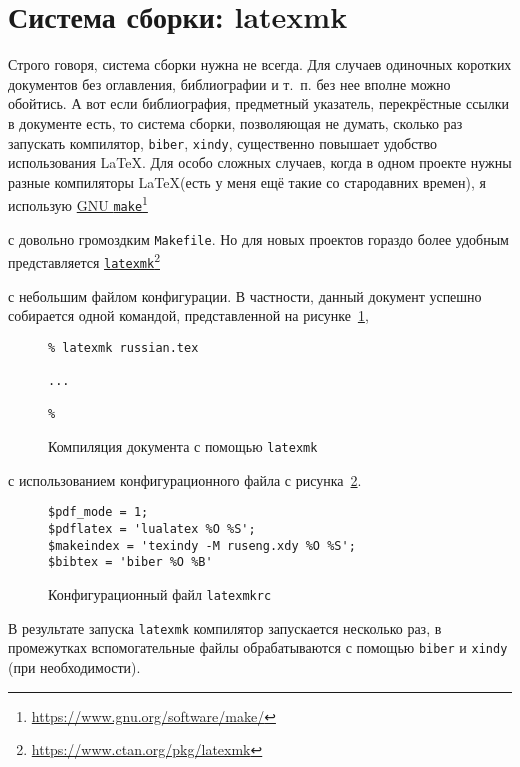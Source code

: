 \documentclass[a4paper,12pt]{article}
\let\orighref=\href
\renewcommand\href[2]{%
  \orighref{#1}{#2}\footnote{\url{#1}}%
}
\begin{document}
\section{Система сборки: latexmk}
Строго говоря, система сборки нужна не всегда. Для случаев одиночных коротких
документов без оглавления, библиографии и т.~п. без нее вполне можно
обойтись. А вот если библиография, предметный указатель, перекрёстные
ссылки в документе есть, то система сборки, позволяющая не думать, сколько
раз запускать компилятор, \texttt{biber}, \texttt{xindy}, существенно
повышает удобство использования \LaTeX. Для особо сложных случаев, когда
в одном проекте нужны разные компиляторы \LaTeX (есть у меня ещё такие со
стародавних времен), я использую
\href{https://www.gnu.org/software/make/}{GNU \texttt{make}}
с довольно громоздким \texttt{Makefile}. Но для новых проектов гораздо
более удобным представляется
\href{https://www.ctan.org/pkg/latexmk}{\texttt{latexmk}}
с небольшим файлом конфигурации. В частности, данный документ успешно
собирается одной командой, представленной на рисунке~\ref{latexmk1},
\begin{figure}[tp]
\footnotesize
\begin{verbatim}
% latexmk russian.tex

...

%
\end{verbatim}
\caption{Компиляция документа с помощью \texttt{latexmk}}\label{latexmk1}
\end{figure}
с использованием конфигурационного файла с рисунка~\ref{latexmk2}.
\begin{figure}[tp]
\footnotesize
\begin{verbatim}
$pdf_mode = 1;
$pdflatex = 'lualatex %O %S';
$makeindex = 'texindy -M ruseng.xdy %O %S';
$bibtex = 'biber %O %B'
\end{verbatim}
\caption{Конфигурационный файл \texttt{latexmkrc}}\label{latexmk2}
\end{figure}
В результате запуска \texttt{latexmk} компилятор запускается несколько раз,
в промежутках вспомогательные файлы обрабатываются с помощью \texttt{biber}
и \texttt{xindy} (при необходимости).
\end{document}

